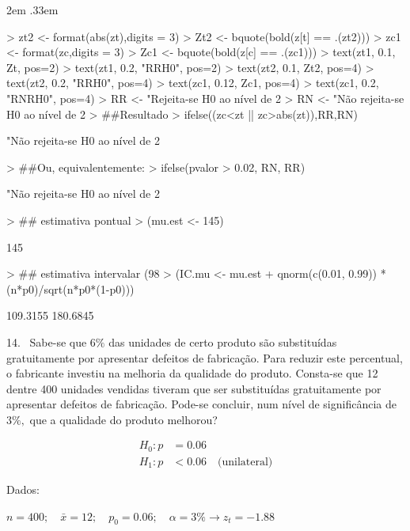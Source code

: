\documentclass{article}
\newenvironment{ManualExercise}
  {\begin{list}{}{\leftmargin \QuestionIndent
    \partopsep0pt \parsep\parskip \topsep\QuestionBefore
    \itemsep\QuestionBefore \labelwidth2em
    \labelsep.33em
    \usecounter{Question}}}
  {\end{list}}
\begin{document}
\begin{Exercise}
\begin{ManualExercise}
\begin{Schunk}
\begin{Sinput}
> zt2 <- format(abs(zt),digits = 3)
> Zt2 <- bquote(bold(z[t] == .(zt2)))
> zc1 <- format(zc,digits = 3)
> Zc1 <- bquote(bold(z[c] == .(zc1)))
> text(zt1, 0.1, Zt, pos=2)
> text(zt1, 0.2, "RRH0", pos=2)
> text(zt2, 0.1, Zt2, pos=4)
> text(zt2, 0.2, "RRH0", pos=4)
> text(zc1, 0.12, Zc1, pos=4)
> text(zc1, 0.2, "RNRH0", pos=4)
> RR <- "Rejeita-se H0 ao nível de 2%
> RN <- "Não rejeita-se H0 ao nível de 2%
> ##Resultado
> ifelse((zc<zt || zc>abs(zt)),RR,RN)
\end{Sinput}
\begin{Soutput}
[1] "Não rejeita-se H0 ao nível de 2%
\end{Soutput}
\begin{Sinput}
> ##Ou, equivalentemente:
> ifelse(pvalor > 0.02, RN, RR)
\end{Sinput}
\begin{Soutput}
[1] "Não rejeita-se H0 ao nível de 2%
\end{Soutput}
\begin{Sinput}
> ## estimativa pontual
> (mu.est <- 145)
\end{Sinput}
\begin{Soutput}
[1] 145
\end{Soutput}
\begin{Sinput}
> ## estimativa intervalar (98%
> (IC.mu <- mu.est + qnorm(c(0.01, 0.99)) * (n*p0)/sqrt(n*p0*(1-p0)))
\end{Sinput}
\begin{Soutput}
[1] 109.3155 180.6845
\end{Soutput}
\end{Schunk}

\item[14.~]Sabe-se que $6\%$ das unidades de certo produto são substituídas gratuitamente por apresentar defeitos de fabricação. Para reduzir este percentual, o fabricante investiu na melhoria da qualidade do produto. Consta-se que 12 dentre 400 unidades vendidas tiveram que ser substituídas gratuitamente por apresentar defeitos de fabricação. Pode-se concluir, num nível de significância de $3\%,$ que a qualidade do produto melhorou?

\begin{align*}
H_{0}: p&=0.06 \\
H_{1}: p&< 0.06\quad \textrm{(unilateral)}
\end{align*}

Dados:

$n=400;\quad \bar{x}=12;\quad p_{0}=0.06;\quad \alpha=3\% \rightarrow z_{t}=-1.88$


\end{ManualExercise}
\end{Exercise}
\end{document}
